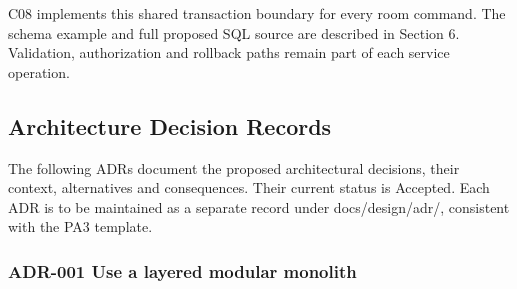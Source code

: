 \vspace{2mm}

C08 implements this shared transaction boundary for every room command. The schema example and full proposed SQL source are described in Section 6. Validation, authorization and rollback paths remain part of each service operation.\par

\subsection{Architecture Decision Records}

The following ADRs document the proposed architectural decisions, their context, alternatives and consequences. Their current status is Accepted. Each ADR is to be maintained as a separate record under docs/design/adr/, consistent with the PA3 template.\par

\subsubsection{ADR-001 Use a layered modular monolith}

